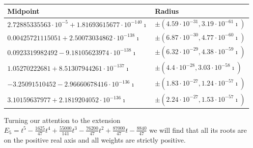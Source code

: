 \documentclass[a4paper,10pt]{article}
\begin{document}
\begin{center}
  \begin{tabular}{|l|l|}
  \hline
  Midpoint & Radius \\
  \hline
  $2.72885335563 \cdot 10^{-5} + 1.81693615677 \cdot 10^{-140}\imath$ & $\pm (4.59 \cdot 10^{-31}, 3.19 \cdot 10^{-61}\imath)$ \\
  $0.00425721115051 + 2.50073034862 \cdot 10^{-138}\imath$            & $\pm (6.87 \cdot 10^{-30}, 4.77 \cdot 10^{-60}\imath)$ \\
  $0.0923319982492 - 9.18105623974 \cdot 10^{-138}\imath$             & $\pm (6.32 \cdot 10^{-29}, 4.38 \cdot 10^{-59}\imath)$ \\
  $1.05270222681 + 8.51307944261 \cdot 10^{-137}\imath$               & $\pm (4.4 \cdot 10^{-28},  3.03 \cdot 10^{-58}\imath)$ \\
  $-3.25091510452 - 2.96660678416 \cdot 10^{-136}\imath$              & $\pm (1.83 \cdot 10^{-27}, 1.24 \cdot 10^{-57}\imath)$ \\
  $3.10159637977 + 2.1819204052 \cdot 10^{-136}\imath$                & $\pm (2.24 \cdot 10^{-27}, 1.53 \cdot 10^{-57}\imath)$ \\
  \hline
  \end{tabular}
\end{center}
Turning our attention to the extension
$E_5 = t^5 - \frac{1625}{47}t^4 + \frac{55000}{141}t^3 - \frac{76200}{47}t^2 + \frac{87000}{47}t - \frac{8840}{47}$
we will find that all its roots are on the positive real axis and all weights are strictly positive.
\end{document}
